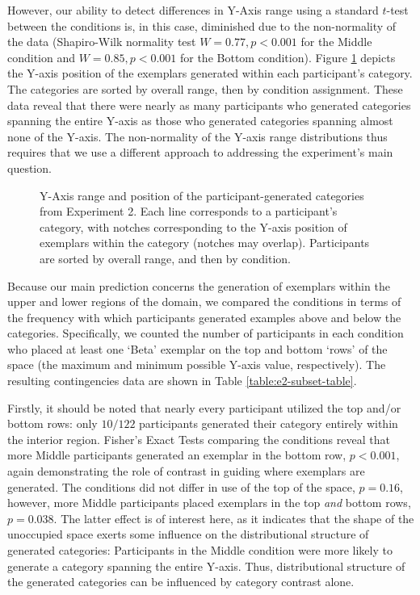 \documentclass[12pt]{article}
\newcommand\inputpgf[2]{{
\let\pgfimageWithoutPath\pgfimage
\renewcommand{\pgfimage}[2][]{\pgfimageWithoutPath[##1]{#1/##2}}

}}
\begin{document}
\begin{flushleft}
However, our ability to detect differences in Y-Axis range using a standard $t$-test between the conditions is, in this case, diminished due to the non-normality of the data (Shapiro-Wilk normality test $W=0.77, p< 0.001$ for the Middle condition and $W=0.85, p < 0.001$ for the Bottom condition). Figure \ref{fig:e2-yranges} depicts the Y-axis position of the exemplars generated within each participant's category. The categories are sorted by overall range, then by condition assignment. These data reveal that there were nearly as many participants who generated categories spanning the entire Y-axis as those who generated categories spanning almost none of the Y-axis. The non-normality of the Y-axis range distributions thus requires that we use a different approach to addressing the experiment's main question.

\begin{figure}
    \begin{center}
    \inputpgf{figs/}{e2-yranges.pgf}
    \caption{Y-Axis range and position of the participant-generated categories from Experiment 2. Each line corresponds to a participant's category, with notches corresponding to the Y-axis position of exemplars within the category (notches may overlap). Participants are sorted by overall range, and then by condition. }
    \label{fig:e2-yranges}
    \end{center}
\end{figure}

Because our main prediction concerns the generation of exemplars within the upper and lower regions of the domain, we compared the conditions in terms of the frequency with which participants generated examples above and below the categories. Specifically, we counted the number of participants in each condition who placed at least one `Beta' exemplar on the top and bottom `rows' of the space (the maximum and minimum possible Y-axis value, respectively). The resulting contingencies data are shown in Table \ref{table:e2-subset-table}. 

Firstly, it should be noted that nearly every participant utilized the top and/or bottom rows: only $10 / 122$ participants generated their category entirely within the interior region. Fisher's Exact Tests comparing the conditions reveal that more Middle participants generated an exemplar in the bottom row, $p < 0.001$, again demonstrating the role of contrast in guiding where exemplars are generated. The conditions did not differ in use of the top of the space, $p = 0.16$, however, more Middle participants placed exemplars in the top {\em and} bottom rows, $p = 0.038$. The latter effect is of interest here, as it indicates that the shape of the unoccupied space exerts some influence on the distributional structure of generated categories: Participants in the Middle condition were more likely to generate a category spanning the entire Y-axis. Thus, distributional structure of the generated categories can be influenced by category contrast alone.


\end{flushleft}
\end{document}
